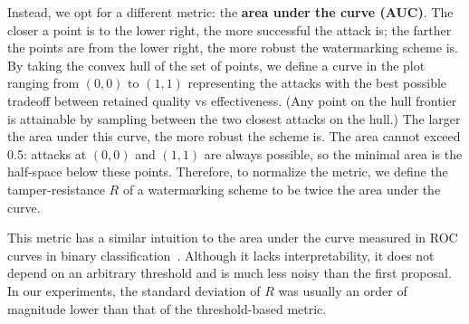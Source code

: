 Instead, we opt for a different metric: the \textbf{area under the curve (AUC)}.
%
The closer a point is to the lower right, the more successful the attack is; the farther the points are from the lower right, the more robust the watermarking scheme is.
%
By taking the convex hull of the set of points, 
we define a curve in the plot ranging from $(0,0)$ to $(1,1)$ representing the attacks with the best possible tradeoff between retained quality vs effectiveness.
(Any point on the hull frontier is attainable by sampling between the two closest attacks on the hull.)
%
The larger the area under this curve, the more robust the scheme is.
%
The area cannot exceed 0.5: attacks at 
$(0,0)$ and $(1,1)$ are always possible, so the minimal area is the half-space below these points.
%
Therefore, to normalize the metric, we define the tamper-resistance $R$ of a watermarking scheme to be twice the area under the curve.

This metric has a similar intuition to the area under the curve measured in ROC curves in binary classification~\citep{fawcett_introduction_2006}.
%
Although it lacks interpretability, it does not depend on an arbitrary threshold and is much less noisy than the first proposal. 
In our experiments, the standard deviation of $R$ was usually an order of magnitude lower than that of the threshold-based metric.
%



